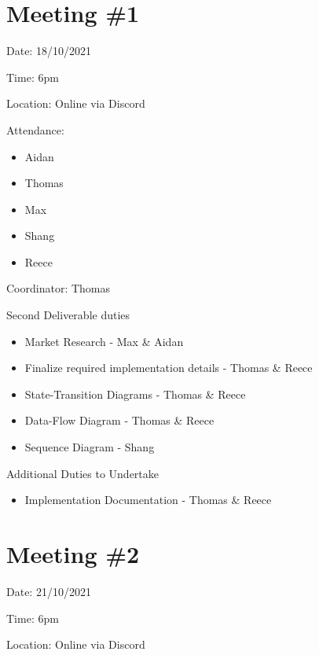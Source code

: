 \documentclass[a4paper,11pt]{report}
\begin{document}
\section{Meeting \#1}

\begin{flushright}
    Date: 18/10/2021

    Time: 6pm

    Location: Online via Discord
\end{flushright}

\Large{Attendance:}
\normalsize

\begin{itemize}
    \item Aidan
    \item Thomas
    \item Max
    \item Shang
    \item Reece
\end{itemize}

Coordinator: Thomas

\vspace{1cm}

\Large{Second Deliverable duties}
\normalsize

\begin{itemize}
    \item Market Research - Max \& Aidan
    \item Finalize required implementation details - Thomas \& Reece
    \item State-Transition Diagrams - Thomas \& Reece
    \item Data-Flow Diagram - Thomas \& Reece
    \item Sequence Diagram - Shang
\end{itemize}

\vspace{0.5cm}

\Large{Additional Duties to Undertake}
\normalsize
\begin{itemize}
    \item Implementation Documentation - Thomas \& Reece
\end{itemize}

\newpage
\section{Meeting \#2}

\begin{flushright}
    Date: 21/10/2021

    Time: 6pm

    Location: Online via Discord
\end{flushright}
\end{document}
